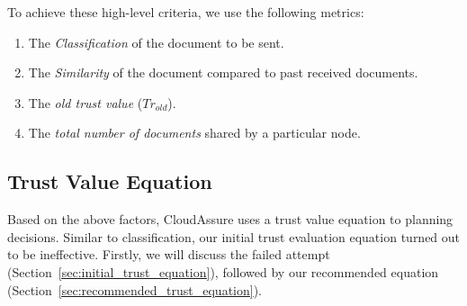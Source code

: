 To achieve these high-level criteria, we use the following metrics:
\begin{enumerate}
    \item The \emph{Classification} of the document to be sent.
    \item The \emph{Similarity} of the document compared to past received
        documents.
    \item The \emph{old trust value} (\(Tr_{old}\)).
    \item The \emph{total number of documents} shared by a particular node.
\end{enumerate}

\subsection{Trust Value Equation}
Based on the above factors, CloudAssure uses a trust value equation to planning 
decisions. Similar to classification, our initial trust evaluation equation
turned out to be ineffective. Firstly, we will discuss the failed attempt
(Section~\ref{sec:initial_trust_equation}), followed by our recommended equation
(Section~\ref{sec:recommended_trust_equation}). 


